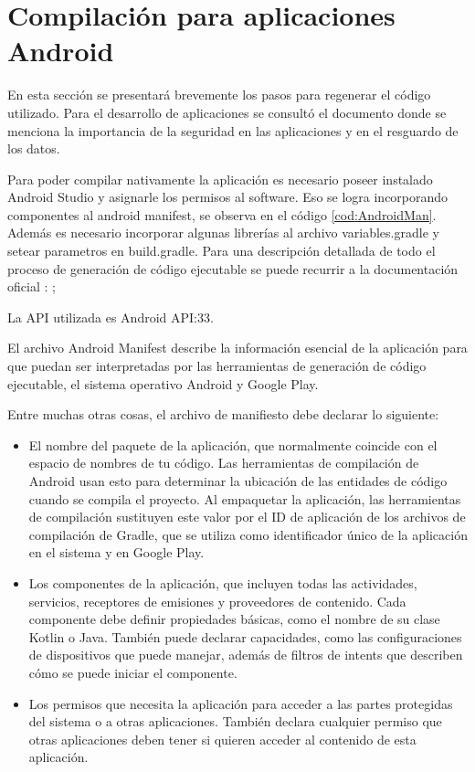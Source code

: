 
\chapter{Compilación para aplicaciones Android} %

\label{Compilación para aplicaciones Android} %

En esta sección se presentará brevemente los pasos para regenerar el código utilizado. Para el desarrollo de aplicaciones se consultó el documento \citep{BOOK:3} donde se menciona la importancia de la seguridad en las aplicaciones y en el resguardo de los datos.

Para poder compilar nativamente la aplicación es necesario poseer instalado Android Studio \citep{WEBSITE:41} y asignarle los permisos al software. Eso se logra incorporando componentes al android manifest, se observa en el código \ref{cod:AndroidMan}. Además es necesario incorporar algunas librerías al archivo variables.gradle y setear parametros en build.gradle. Para una descripción detallada de todo el proceso de generación de código ejecutable se puede recurrir a la documentación oficial : \citep{WEBSITE:42};

La API utilizada es Android API:33.

El archivo Android Manifest describe la información esencial de la aplicación para que puedan ser interpretadas por las herramientas de generación de código ejecutable, el sistema operativo Android y Google Play.

Entre muchas otras cosas, el archivo de manifiesto debe declarar lo siguiente:
\begin{itemize}


\item El nombre del paquete de la aplicación, que normalmente coincide con el espacio de nombres de tu código. Las herramientas de compilación de Android usan esto para determinar la ubicación de las entidades de código cuando se compila el proyecto. Al empaquetar la aplicación, las herramientas de compilación sustituyen este valor por el ID de aplicación de los archivos de compilación de Gradle, que se utiliza como identificador único de la aplicación en el sistema y en Google Play. 
\item Los componentes de la aplicación, que incluyen todas las actividades, servicios, receptores de emisiones y proveedores de contenido. Cada componente debe definir propiedades básicas, como el nombre de su clase Kotlin o Java. También puede declarar capacidades, como las configuraciones de dispositivos que puede manejar, además de filtros de intents que describen cómo se puede iniciar el componente. 
\item Los permisos que necesita la aplicación para acceder a las partes protegidas del sistema o a otras aplicaciones. También declara cualquier permiso que otras aplicaciones deben tener si quieren acceder al contenido de esta aplicación. 
\end{itemize}


